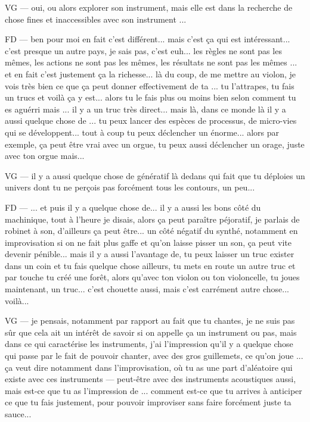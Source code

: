 VG — oui, ou alors explorer son instrument, mais elle est dans la recherche de chose fines et inaccessibles avec son instrument ... 

FD — ben pour moi en fait c'est différent... mais c'est ça qui est intéressant... c'est presque un autre pays, je sais pas, c'est euh... les règles ne sont pas les mêmes, les actions ne sont pas les mêmes, les résultats ne sont pas les mêmes ... et en fait c'est justement ça la richesse... là du coup, de me mettre au violon, je vois très bien ce que ça peut donner effectivement de ta ... tu l'attrapes, tu fais un trucs et voilà ça y est... alors tu le fais plus ou moins bien selon comment tu es aguérri mais ... il y a un truc très direct... mais là, dans ce monde là il y a aussi quelque chose de ... tu peux lancer des espèces de processus, de micro-vies qui se développent... tout à coup tu peux déclencher un énorme... alors par exemple, ça peut être vrai avec un orgue, tu peux aussi déclencher un orage, juste avec ton orgue mais... 

VG — il y a aussi quelque chose de génératif là dedans qui fait que tu déploies un univers dont tu ne perçois pas forcément tous les contours, un peu... 

FD — ... et puis il y a quelque chose de... il y a aussi les bons côté du machinique, tout à l'heure je disais, alors ça peut paraître péjoratif, je parlais de robinet à son, d'ailleurs ça peut être... un côté négatif du synthé, notamment en improvisation si on ne fait plus gaffe et qu'on laisse pisser un son, ça peut vite devenir pénible... mais il y a aussi l'avantage de,  tu peux laisser un truc exister dans un coin et tu fais quelque chose ailleurs, tu mets en route un autre truc et par touche tu créé une forêt, alors qu'avec ton violon ou ton violoncelle, tu joues maintenant, un truc... c'est chouette aussi, mais c'est carrément autre chose... voilà... 

VG — je pensais, notamment par rapport au fait que tu chantes, je ne suis pas sûr que cela ait un intérêt de savoir si on appelle ça un instrument ou pas, mais dans ce qui caractérise les instruments, j'ai l'impression qu'il y a quelque chose qui passe par le fait de pouvoir chanter, avec des gros guillemets, ce qu'on joue ... ça veut dire notamment dans l'improvisation, où tu as une part d'aléatoire qui existe avec ces instruments — peut-être avec des instruments acoustiques aussi, mais est-ce que tu as l'impression de ... comment est-ce que tu arrives à anticiper ce que tu fais justement, pour pouvoir improviser sans faire forcément juste ta sauce... 

